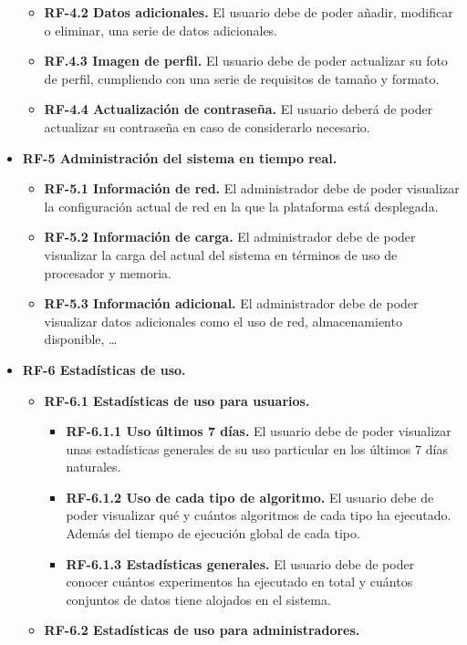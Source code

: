 \begin{itemize}
\begin{itemize}
	\item \textbf{RF-4.2 Datos adicionales.} El usuario debe de poder añadir, modificar o eliminar, una serie de datos adicionales.
	\item \textbf{RF.4.3 Imagen de perfil.} El usuario debe de poder actualizar su foto de perfil, cumpliendo con una serie de requisitos de tamaño y formato.
	\item \textbf{RF-4.4 Actualización de contraseña.} El usuario deberá de poder actualizar su contraseña en caso de considerarlo necesario.
	\end{itemize}
	\pagebreak
\item \textbf{RF-5 Administración del sistema en tiempo real.}
	\begin{itemize}
	\tightlist
	\item \textbf{RF-5.1 Información de red.} El administrador debe de poder visualizar la configuración actual de red en la que la plataforma está desplegada.
	\item \textbf{RF-5.2 Información de carga.} El administrador debe de poder visualizar la carga del actual del sistema en términos de uso de procesador y memoria.
	\item \textbf{RF-5.3 Información adicional.} El administrador debe de poder visualizar datos adicionales como el uso de red, almacenamiento disponible, \dots
	\end{itemize}
\item \textbf{RF-6 Estadísticas de uso.}
	\begin{itemize}
	\tightlist
	\item \textbf{RF-6.1 Estadísticas de uso para usuarios.}
	\begin{itemize}
	\tightlist
		\item \textbf{RF-6.1.1 Uso últimos 7 días.} El usuario debe de poder visualizar unas estadísticas generales de su uso particular en los últimos 7 días naturales.
		\item \textbf{RF-6.1.2 Uso de cada tipo de algoritmo.} El usuario debe de poder visualizar qué y cuántos algoritmos de cada tipo ha ejecutado. Además del tiempo de ejecución global de cada tipo.
		\item \textbf{RF-6.1.3 Estadísticas generales.} El usuario debe de poder conocer cuántos experimentos ha ejecutado en total y cuántos conjuntos de datos tiene alojados en el sistema.
	\end{itemize}
	\item \textbf{RF-6.2 Estadísticas de uso para administradores.}
	\begin{itemize}

\end{itemize}
\end{itemize}
\end{itemize}

